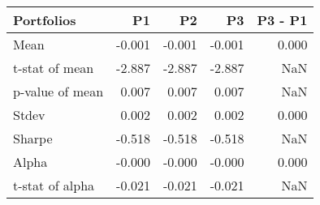 \begin{tabular}{lrrrr}
\toprule
Portfolios & P1 & P2 & P3 & P3 - P1 \\
\midrule
Mean & -0.001 & -0.001 & -0.001 & 0.000 \\
t-stat of mean & -2.887 & -2.887 & -2.887 & NaN \\
p-value of mean & 0.007 & 0.007 & 0.007 & NaN \\
Stdev & 0.002 & 0.002 & 0.002 & 0.000 \\
Sharpe & -0.518 & -0.518 & -0.518 & NaN \\
Alpha & -0.000 & -0.000 & -0.000 & 0.000 \\
t-stat of alpha & -0.021 & -0.021 & -0.021 & NaN \\
\bottomrule
\end{tabular}
